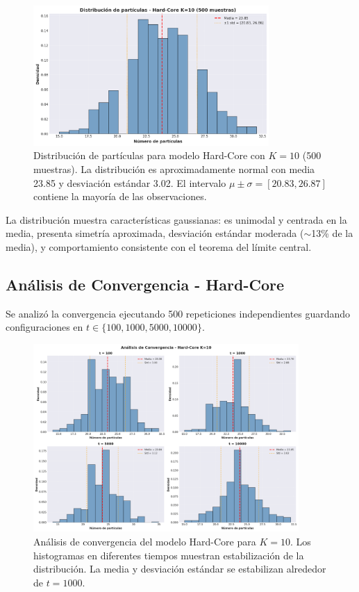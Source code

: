 \begin{figure}[H]
\centering
\includegraphics[width=0.8\textwidth]{../images/hardcore_histograma_particulas.png}
\caption{Distribución de partículas para modelo Hard-Core con $K=10$ (500 muestras). La distribución es aproximadamente normal con media 23.85 y desviación estándar 3.02. El intervalo $\mu \pm \sigma = [20.83, 26.87]$ contiene la mayoría de las observaciones.}
\end{figure}

La distribución muestra características gaussianas: es unimodal y centrada en la media, presenta simetría aproximada, desviación estándar moderada ($\sim$13\% de la media), y comportamiento consistente con el teorema del límite central.

\subsection{Análisis de Convergencia - Hard-Core}

Se analizó la convergencia ejecutando 500 repeticiones independientes guardando configuraciones en $t \in \{100, 1000, 5000, 10000\}$.

\begin{figure}[H]
\centering
\includegraphics[width=0.9\textwidth]{../images/hardcore_convergencia.png}
\caption{Análisis de convergencia del modelo Hard-Core para $K=10$. Los histogramas en diferentes tiempos muestran estabilización de la distribución. La media y desviación estándar se estabilizan alrededor de $t=1000$.}
\end{figure}

